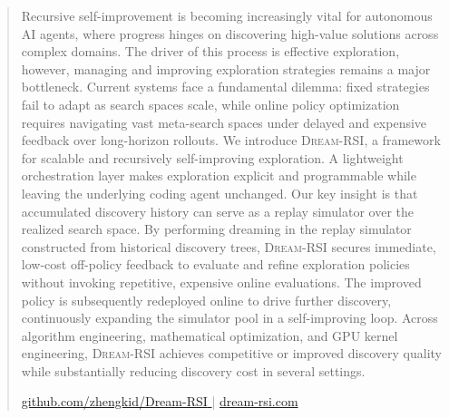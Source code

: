 \begin{abstract}
Recursive self-improvement is becoming increasingly vital for autonomous AI agents, where progress hinges on discovering high-value solutions across complex domains. The driver of this process is effective exploration, however, managing and improving exploration strategies remains a major bottleneck. Current systems face a fundamental dilemma: fixed strategies fail to adapt as search spaces scale, while online policy optimization requires navigating vast meta-search spaces under delayed and expensive feedback over long-horizon rollouts. We introduce \textsc{Dream-RSI}, a framework for scalable and recursively self-improving exploration. A lightweight orchestration layer makes exploration explicit and programmable while leaving the underlying coding agent unchanged. Our key insight is that accumulated discovery history can serve as a replay simulator over the realized search space. By performing dreaming in the replay simulator constructed from historical discovery trees, \textsc{Dream-RSI} secures immediate, low-cost off-policy feedback to evaluate and refine exploration policies without invoking repetitive, expensive online evaluations. The improved policy is subsequently redeployed online to drive further discovery, continuously expanding the simulator pool in a self-improving loop. Across algorithm engineering, mathematical optimization, and GPU kernel engineering, \textsc{Dream-RSI} achieves competitive or improved discovery quality while substantially reducing discovery cost in several settings.

\par\vspace{0.6em}
{\centering
\href{https://github.com/zhengkid/Dream-RSI}{%
\raisebox{-0.12em}{\Large\color{black}\faGithub}\hspace{0.35em}%
{\small\ttfamily\color{blue}github.com/zhengkid/Dream-RSI}%
}
\hspace{1.5em}\textcolor{gray}{|}\hspace{1.5em}%
\href{https://dream-rsi.com/}{%
\raisebox{-0.12em}{\Large\color{black}\faGlobe}\hspace{0.35em}%
{\small\ttfamily\color{blue}dream-rsi.com}%
}
\par}
\end{abstract}